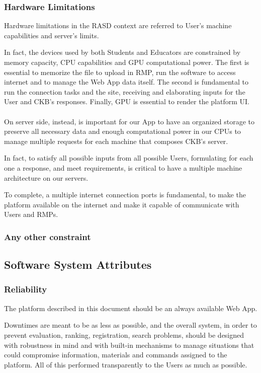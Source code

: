 \subsubsection{Hardware Limitations}
Hardware limitations in the RASD context are referred to User's machine capabilities and server's limits. 

In fact, the devices used by both Students and Educators are constrained by memory capacity, CPU capabilities and GPU computational power. The first is essential to memorize the file to upload in RMP, run the software to access internet
 and to manage the Web App data itself. The second is fundamental to run the connection tasks and the site, receiving and elaborating inputs for the User and CKB's responses. Finally, GPU is essential to render the platform UI.\\
\\
 On server side, instead, is important for our App to have an organized storage to preserve all necessary data and enough computational power in our CPUs to manage multiple requests for each machine that composes CKB's server. 
 
In fact, to satisfy all possible inputs from all possible Users, formulating for each one a response, and meet requirements, is critical to have a multiple machine architecture on our servers. 

To complete, a multiple internet connection ports is fundamental, to make the platform available on the internet and make it capable of communicate with Users and RMPs.
\subsubsection{Any other constraint}

\subsection{Software System Attributes}

\subsubsection{Reliability}
The platform described in this document should be an always available Web App. 

Downtimes are meant to be as less as possible, and the overall system, in order to prevent evaluation, ranking, registration, search problems, should be designed with robustness in mind and with built-in mechanisms to manage situations 
that could compromise information, materials and commands assigned to the platform. All of this performed transparently to the Users as much as possible.


